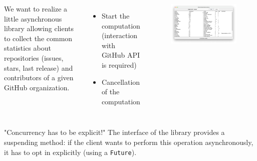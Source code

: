 \documentclass[aspectratio=1610,xcolor=dvipsnames]{beamer}
\begin{document}
\begin{frame}
  \begin{columns}[c,onlytextwidth] %
      \begin{example}[2]
          We want to realize a little asynchronous library allowing clients to collect the common statistics about repositories (issues, stars, last release) and contributors of a given GitHub organization.
      \end{example}
      \begin{itemize}
          \item Start the computation (interaction with GitHub API is required)
          \item Cancellation of the computation
      \end{itemize}
      \begin{figure}
          \centering
          \includegraphics[width=\textwidth]{./images/analyzer-e2e.png}
      \end{figure}
  \end{columns}
\end{frame}


\begin{frame}{"Concurrency has to be explicit!"}
  The interface of the library provides a suspending method: if the client wants to perform this operation asynchronously, it has to opt in explicitly (using a \texttt{Future}).
  
\end{frame}

\end{document}
